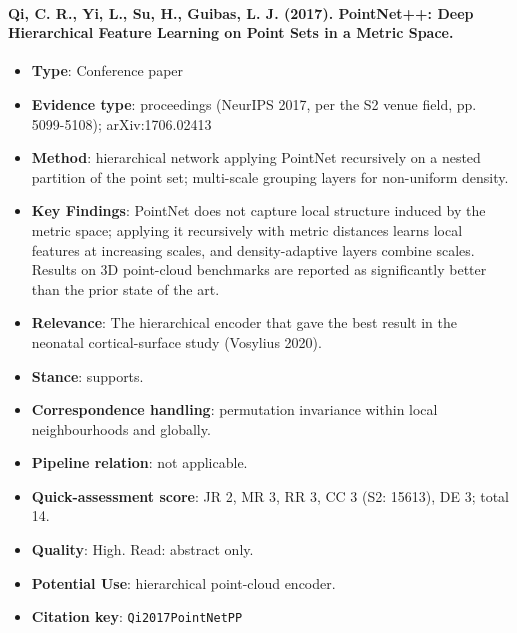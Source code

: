 \documentclass[journal,onecolumn]{IEEEtran}
\begin{document}
\paragraph{Qi, C. R., Yi, L., Su, H., Guibas, L. J. (2017). PointNet++: Deep Hierarchical Feature Learning on Point Sets in a Metric Space.~\cite{Qi2017PointNetPP}}\mbox{}

\begin{itemize}

\item{} \textbf{Type}: Conference paper

\item{} \textbf{Evidence type}: proceedings (NeurIPS 2017, per the S2 venue field, pp. 5099-5108); arXiv:1706.02413

\item{} \textbf{Method}: hierarchical network applying PointNet recursively on a nested partition of the point set; multi-scale grouping layers for non-uniform density.

\item{} \textbf{Key Findings}: PointNet does not capture local structure induced by the metric space; applying it recursively with metric distances learns local features at increasing scales, and density-adaptive layers combine scales. Results on 3D point-cloud benchmarks are reported as significantly better than the prior state of the art.

\item{} \textbf{Relevance}: The hierarchical encoder that gave the best result in the neonatal cortical-surface study (Vosylius 2020).

\item{} \textbf{Stance}: supports.

\item{} \textbf{Correspondence handling}: permutation invariance within local neighbourhoods and globally.

\item{} \textbf{Pipeline relation}: not applicable.

\item{} \textbf{Quick-assessment score}: JR 2, MR 3, RR 3, CC 3 (S2: 15613), DE 3; total 14.

\item{} \textbf{Quality}: High. Read: abstract only.

\item{} \textbf{Potential Use}: hierarchical point-cloud encoder.

\item{} \textbf{Citation key}: \texttt{Qi2017PointNetPP}

\end{itemize}
\end{document}
